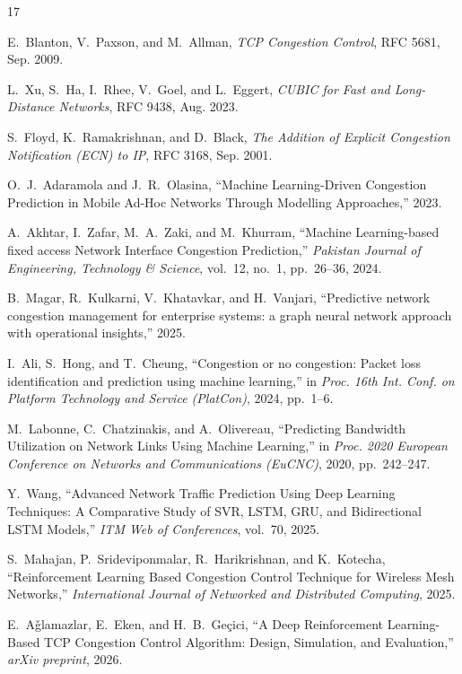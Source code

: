 \begin{thebibliography}{17}

E.~Blanton, V.~Paxson, and M.~Allman, \textit{TCP Congestion Control}, RFC 5681, Sep. 2009.

L.~Xu, S.~Ha, I.~Rhee, V.~Goel, and L.~Eggert, \textit{CUBIC for Fast and Long-Distance Networks}, RFC 9438, Aug. 2023.

S.~Floyd, K.~Ramakrishnan, and D.~Black, \textit{The Addition of Explicit Congestion Notification (ECN) to IP}, RFC 3168, Sep. 2001.

O.~J.~Adaramola and J.~R.~Olasina, ``Machine Learning-Driven Congestion Prediction in Mobile Ad-Hoc Networks Through Modelling Approaches,'' 2023.

A.~Akhtar, I.~Zafar, M.~A.~Zaki, and M.~Khurram, ``Machine Learning-based fixed access Network Interface Congestion Prediction,'' \textit{Pakistan Journal of Engineering, Technology \& Science}, vol.~12, no.~1, pp.~26--36, 2024.

B.~Magar, R.~Kulkarni, V.~Khatavkar, and H.~Vanjari, ``Predictive network congestion management for enterprise systems: a graph neural network approach with operational insights,'' 2025.

I.~Ali, S.~Hong, and T.~Cheung, ``Congestion or no congestion: Packet loss identification and prediction using machine learning,'' in \textit{Proc. 16th Int. Conf. on Platform Technology and Service (PlatCon)}, 2024, pp.~1--6.

M.~Labonne, C.~Chatzinakis, and A.~Olivereau, ``Predicting Bandwidth Utilization on Network Links Using Machine Learning,'' in \textit{Proc. 2020 European Conference on Networks and Communications (EuCNC)}, 2020, pp.~242--247.

Y.~Wang, ``Advanced Network Traffic Prediction Using Deep Learning Techniques: A Comparative Study of SVR, LSTM, GRU, and Bidirectional LSTM Models,'' \textit{ITM Web of Conferences}, vol.~70, 2025.

S.~Mahajan, P.~Srideviponmalar, R.~Harikrishnan, and K.~Kotecha, ``Reinforcement Learning Based Congestion Control Technique for Wireless Mesh Networks,'' \textit{International Journal of Networked and Distributed Computing}, 2025.

E.~A\v{g}lamazlar, E.~Eken, and H.~B.~Ge\c{c}ici, ``A Deep Reinforcement Learning-Based TCP Congestion Control Algorithm: Design, Simulation, and Evaluation,'' \textit{arXiv preprint}, 2026.


\end{thebibliography}
